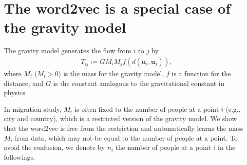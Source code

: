 \documentclass[12pt]{article} %
\def\vec#1{{\bm #1}}
\begin{document}
\section{The word2vec is a special case of the gravity model}

The gravity model generates the flow from $i$ to $j$ by 
\begin{align}
    \label{eq:gravity_model}
    T_{ij}:= G M_i M_j f\left(d(\vec{u}_i,\vec{u}_j)\right),
\end{align}
where $M_i$ ($M_i>0$) is the mass for the gravity model, $f$ is a function for the distance, and 
$G$ is the constant analogous to the gravitational constant in physics.  

In migration study, $M_i$ is often fixed to the number of people at a point $i$ (e.g., city and country), which is a restricted version of the gravity model.
We show that the word2vec is free from the restriction and automatically learns the mass $M_i$ from data, which may not be equal to the number of people at a point.
To avoid the confusion, we denote by $n_i$ the number of people at a point $i$ in the followings. 
\end{document}
